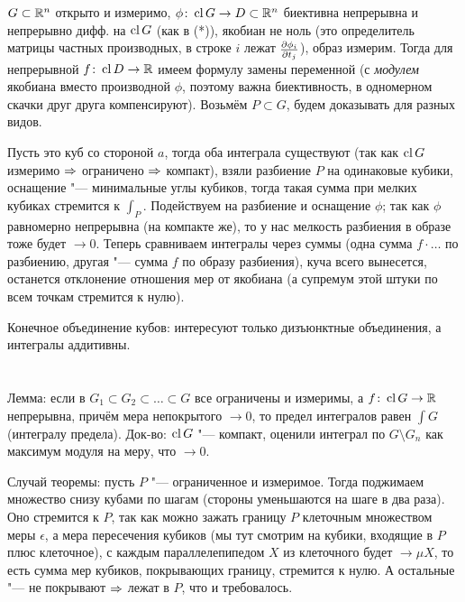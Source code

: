 \section{} %
$G \subset \mathbb{R}^n$ открыто и измеримо, $\phi \colon \operatorname{cl} G \to D \subset \mathbb{R}^n$ биективна непрерывна и непрерывно дифф. на $\operatorname{cl} G$ (как в (*)), якобиан не ноль
(это определитель матрицы частных производных, в строке $i$ лежат $\frac{\partial \phi_i}{\partial t_j}$), образ измерим.
Тогда для непрерывной $f \colon \operatorname{cl} D \to \mathbb{R}$ имеем формулу замены переменной (с \textit{модулем} якобиана вместо производной $\phi$, поэтому важна биективность, в одномерном скачки друг друга компенсируют).
Возьмём $P \subset G$, будем доказывать для разных видов.

Пусть это куб со стороной $a$, тогда оба интеграла существуют (так как $\operatorname{cl} G$ измеримо $\Rightarrow$ ограничено $\Rightarrow$ компакт), взяли разбиение $P$ на одинаковые кубики, оснащение "--- минимальные углы кубиков,
тогда такая сумма при мелких кубиках стремится к $\int_P$.
Подействуем на разбиение и оснащение $\phi$; так как $\phi$ равномерно непрерывна (на компакте же), то у нас мелкость разбиения в образе тоже будет $\to 0$.
Теперь сравниваем интегралы через суммы (одна сумма $f\cdot \dots$ по разбиению, другая "--- сумма $f$ по образу разбиения), куча всего вынесется,
останется отклонение отношения мер от якобиана (а супремум этой штуки по всем точкам стремится к нулю).

Конечное объединение кубов: интересуют только дизъюнктные объединения, а интегралы аддитивны.

\section{} %
Лемма: если в $G_1\subset G_2 \subset \dots \subset G$ все ограничены и измеримы, а $f \colon \operatorname{cl} G \to \mathbb{R}$ непрерывна, причём мера непокрытого $\to 0$, то предел интегралов равен $\int G$ (интегралу предела).
Док-во: $\operatorname{cl} G$ "--- компакт, оценили интеграл по $G \setminus G_n$ как максимум модуля на меру, что $\to 0$.

Случай теоремы: пусть $P$ "--- ограниченное и измеримое.
Тогда поджимаем множество снизу кубами по шагам (стороны уменьшаются на шаге в два раза).
Оно стремится к $P$, так как можно зажать границу $P$ клеточным множеством меры $\epsilon$, а мера пересечения кубиков (мы тут смотрим на кубики, входящие в $P$ плюс клеточное),
с каждым параллелепипедом $X$ из клеточного будет $\to \mu X$, то есть сумма мер кубиков, покрывающих границу, стремится к нулю.
А остальные "--- не покрывают $\Rightarrow$ лежат в $P$, что и требовалось.

